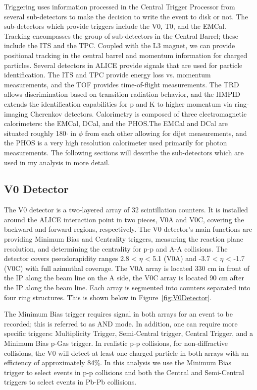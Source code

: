 Triggering uses information processed in the Central Trigger Processor from several sub-detectors to make the decision to write the event to disk or not. The sub-detectors which provide triggers include the V0, T0, and the EMCal. Tracking encompasses the group of sub-detectors in the Central Barrel; these include the ITS and the TPC. Coupled with the L3 magnet, we can provide positional tracking in the central barrel and momentum information for charged particles. Several detectors in ALICE provide signals that are used for particle identification. The ITS and TPC provide energy loss vs. momentum measurements, and the TOF provides time-of-flight measurements. The TRD allows discrimination based on transition radiation behavior, and the HMPID extends the identification capabilities for p and K to higher momentum via ring-imaging Cherenkov detectors. Calorimetry is composed of three electromagnetic calorimeters: the EMCal, DCal, and the PHOS.The EMCal and DCal are situated roughly 180$\cdot$ in $\phi$ from each other allowing for dijet measurements, and the PHOS is a very high resolution calorimeter used primarily for photon measurements. The following sections will describe the sub-detectors which are used in my analysis in more detail.

\subsection{V0 Detector}

The V0 detector is a two-layered array of 32 scintillation counters. It is installed around the ALICE interaction point in two pieces, V0A and V0C, covering the backward and forward regions, respectively. The V0 detector's main functions are providing Minimum Bias and Centrality triggers, measuring the reaction plane resolution, and determining the centrality for p-p and A-A collisions. The detector covers pseudorapidity ranges 2.8 < $\eta$ < 5.1 (V0A) and -3.7 < $\eta$ < -1.7 (V0C) with full azimuthal coverage. The V0A array is located 330 cm in front of the IP along the beam line on the A side, the V0C array is located 90 cm after the IP along the beam line. Each array is segmented into counters separated into four ring structures. This is shown below in Figure~\ref*{fig:V0Detector}.

The Minimum Bias trigger requires signal in both arrays for an event to be recorded; this is referred to as AND mode. In addition, one can require more specific triggers: Multiplicity Trigger, Semi-Central trigger, Central Trigger, and a Minimum Bias p-Gas trigger. In realistic p-p collisions, for non-diffractive collisions, the V0 will detect at least one charged particle in both arrays with an efficiency of approximately 84\%. In this analysis we use the Minimum Bias trigger to select events in p-p collisions and both the Central and Semi-Central triggers to select events in Pb-Pb collisions.

